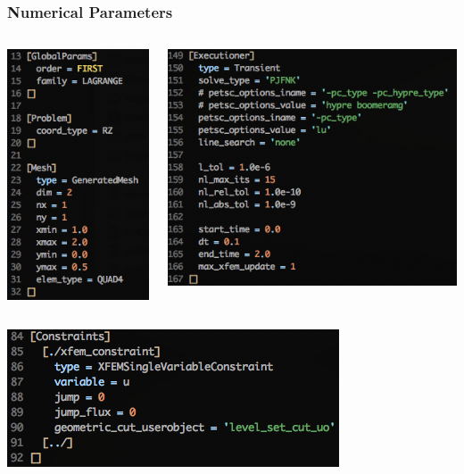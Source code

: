 \documentclass[]{beamer}
\begin{document}
\begin{frame}\frametitle{Numerical Parameters}
  	\begin{columns}
			\begin{center}
			\includegraphics[scale=0.4]{figures/1D_rz_ls1m/Screen-GlobalParams-1Drzls1m}
			\end{center}
			\begin{center}
			\includegraphics[scale=0.4]{figures/1D_rz_ls1m/Screen-Executioner-1Drzls1m}
			\end{center}
	\end{columns}
	\begin{center}
	\includegraphics[scale=0.4]{figures/1D_rz_ls1m/Screen-Constraints-1Drzls1m}
	\end{center}
\end{frame}
\end{document}

